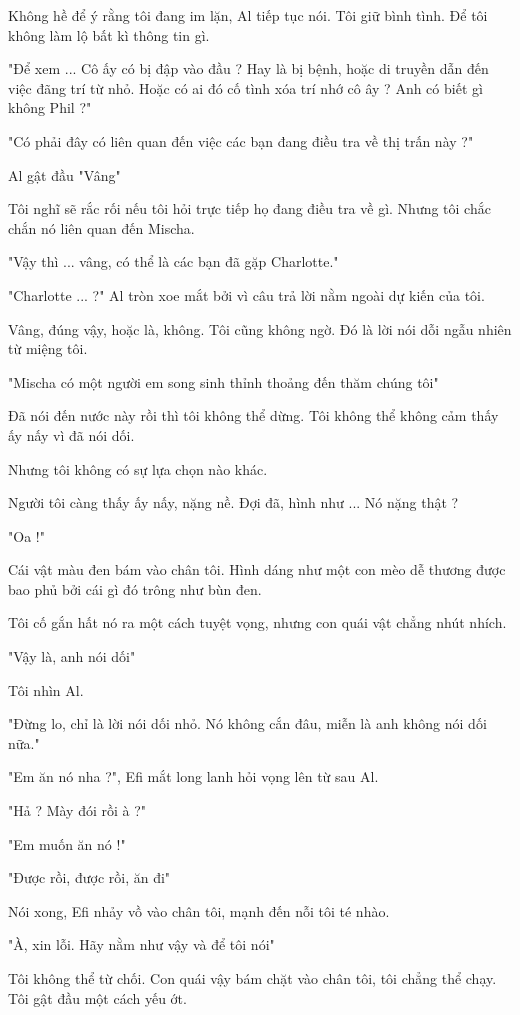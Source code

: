 Không hề để ý rằng tôi đang im lặn, Al tiếp tục nói. Tôi giữ bình tình. Để tôi không làm lộ bất kì thông tin gì.

"Để xem ... Cô ấy có bị đập vào đầu ? Hay là bị bệnh, hoặc di truyền dẫn đến việc đãng trí từ nhỏ. Hoặc có ai đó cố tình xóa trí nhớ cô ây ? Anh có biết gì không Phil ?"

"Có phải đây có liên quan đến việc các bạn đang điều tra về thị trấn này ?"

Al gật đầu "Vâng"

Tôi nghĩ sẽ rắc rối nếu tôi hỏi trực tiếp họ đang điều tra về gì. Nhưng tôi chắc chắn nó liên quan đến Mischa.

"Vậy thì ... vâng, có thể là các bạn đã gặp Charlotte."

"Charlotte ... ?" Al tròn xoe mắt bởi vì câu trả lời nằm ngoài dự kiến của tôi.

Vâng, đúng vậy, hoặc là, không. Tôi cũng không ngờ. Đó là lời nói dỗi ngẫu nhiên từ miệng tôi.

"Mischa có một người em song sinh thỉnh thoảng đến thăm chúng tôi"

Đã nói đến nước này rồi thì tôi không thể dừng. Tôi không thể không cảm thấy ấy nấy vì đã nói dối.

Nhưng tôi không có sự lựa chọn nào khác.

Người tôi càng thấy ấy nấy, nặng nề. Đợi đã, hình như ...
Nó nặng thật ?

"Oa !"

Cái vật màu đen bám vào chân tôi. Hình dáng như một con mèo dễ thương được bao phủ bởi cái gì đó trông như bùn đen.

Tôi cố gắn hất nó ra một cách tuyệt vọng, nhưng con quái vật chẳng nhút nhích.

"Vậy là, anh nói dối"

Tôi nhìn Al.

"Đừng lo, chỉ là lời nói dối nhỏ. Nó không cắn đâu, miễn là anh không nói dối nữa."

"Em ăn nó nha ?", Efi mắt long lanh hỏi vọng lên từ sau Al.

"Hả ? Mày đói rồi à ?"

"Em muốn ăn nó !"

"Được rồi, được rồi, ăn đi"

Nói xong, Efi nhảy vồ vào chân tôi, mạnh đến nỗi tôi té nhào.

"À, xin lỗi. Hãy nằm như vậy và để tôi nói"

Tôi không thể từ chối. Con quái vậy bám chặt vào chân tôi, tôi chẳng thể chạy. Tôi gật đầu một cách yếu ớt.

